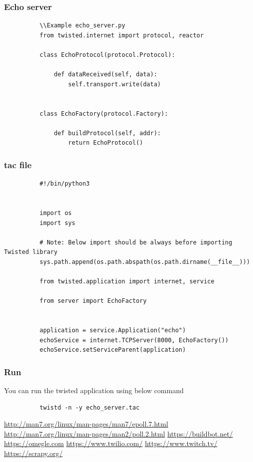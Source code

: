 \documentclass{article}
\begin{document}
      \subsubsection{Echo server}
        \begin{verbatim}
          \\Example echo_server.py
          from twisted.internet import protocol, reactor

          class EchoProtocol(protocol.Protocol):

              def dataReceived(self, data):
                  self.transport.write(data)


          class EchoFactory(protocol.Factory):

              def buildProtocol(self, addr):
                  return EchoProtocol()
        \end{verbatim}

      \subsubsection{tac file}
        \begin{verbatim}
          #!/bin/python3


          import os
          import sys

          # Note: Below import should be always before importing Twisted library
          sys.path.append(os.path.abspath(os.path.dirname(__file__)))

          from twisted.application import internet, service

          from server import EchoFactory


          application = service.Application("echo")
          echoService = internet.TCPServer(8000, EchoFactory())
          echoService.setServiceParent(application)
        \end{verbatim}

      \subsubsection{Run}
        You can run the twisted application using below command

        \begin{verbatim}
          twistd -n -y echo_server.tac
        \end{verbatim}


  \begin{thebibliography}{2}
      \url{http://man7.org/linux/man-pages/man7/epoll.7.html}%
      \url{http://man7.org/linux/man-pages/man2/poll.2.html}%
      \url{https://buildbot.net/}%
      \url{https://omegle.com}%
      \url{https://www.twilio.com/}%
      \url{https://www.twitch.tv/}%
      \url{https://scrapy.org/}%
  \end{thebibliography}
\end{document}
